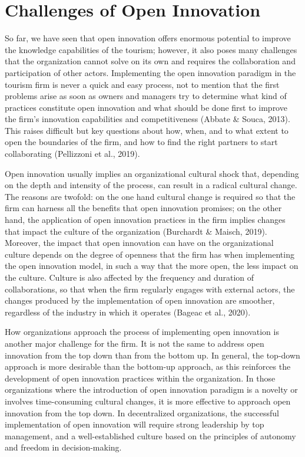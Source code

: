 \documentclass[
  letterpaper,
  DIV=11,
  numbers=noendperiod]{scrreprt}
\begin{document}
\hypertarget{challenges-of-open-innovation}{%
\section{Challenges of Open
Innovation}\label{challenges-of-open-innovation}}

So far, we have seen that open innovation offers enormous potential to
improve the knowledge capabilities of the tourism; however, it also
poses many challenges that the organization cannot solve on its own and
requires the collaboration and participation of other actors.
Implementing the open innovation paradigm in the tourism firm is never a
quick and easy process, not to mention that the first problems arise as
soon as owners and managers try to determine what kind of practices
constitute open innovation and what should be done first to improve the
firm's innovation capabilities and competitiveness (Abbate \& Souca,
2013). This raises difficult but key questions about how, when, and to
what extent to open the boundaries of the firm, and how to find the
right partners to start collaborating (Pellizzoni et al., 2019).

Open innovation usually implies an organizational cultural shock that,
depending on the depth and intensity of the process, can result in a
radical cultural change. The reasons are twofold: on the one hand
cultural change is required so that the firm can harness all the
benefits that open innovation promises; on the other hand, the
application of open innovation practices in the firm implies changes
that impact the culture of the organization (Burchardt \& Maisch, 2019).
Moreover, the impact that open innovation can have on the organizational
culture depends on the degree of openness that the firm has when
implementing the open innovation model, in such a way that the more
open, the less impact on the culture. Culture is also affected by the
frequency and duration of collaborations, so that when the firm
regularly engages with external actors, the changes produced by the
implementation of open innovation are smoother, regardless of the
industry in which it operates (Bageac et al., 2020).

How organizations approach the process of implementing open innovation
is another major challenge for the firm. It is not the same to address
open innovation from the top down than from the bottom up. In general,
the top-down approach is more desirable than the bottom-up approach, as
this reinforces the development of open innovation practices within the
organization. In those organizations where the introduction of open
innovation paradigm is a novelty or involves time-consuming cultural
changes, it is more effective to approach open innovation from the top
down. In decentralized organizations, the successful implementation of
open innovation will require strong leadership by top management, and a
well-established culture based on the principles of autonomy and freedom
in decision-making.
\end{document}

